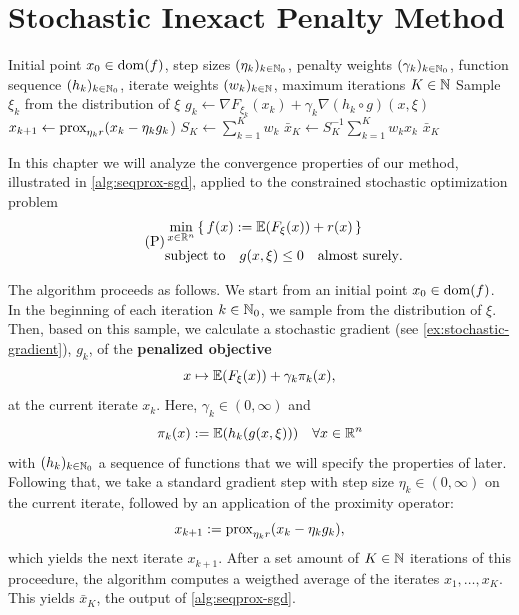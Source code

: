 \chapter{Stochastic Inexact Penalty Method}
\label{chap:sipm}

\begin{algorithm}[t]
\caption{Stochastic Inexact Penalty Method}
\label{alg:seqprox-sgd}
\begin{algorithmic}[1]
\Require Initial point $x_0\in\operatorname{dom}(f)$, step sizes $(\eta_k)_{k\in\mathbb{N}_0}$,
penalty weights $(\gamma_k)_{k\in\mathbb{N}_0}$,
function sequence $(h_k)_{k\in\mathbb{N}_0}$,
iterate weights $(w_k)_{k\in\mathbb{N}}$, maximum iterations $K\in\mathbb{N}$
    \State Sample $\xi_k$ from the distribution of $\xi$ 
    \State $g_k \gets \nabla F_{\xi_k}(x_{k}) + \gamma_k \nabla (h_k \circ g)(x,\xi)$
    \State $x_{k+1} \gets \textnormal{prox}_{\eta_k r} (x_k - \eta_k g_k$)
\EndFor
\State $S_K \gets \sum_{k=1}^{K} w_k$
\State $\bar{x}_K \gets S_K^{-1} \sum_{k=1}^{K} w_k x_k$
\State \Return $\bar{x}_{K}$
\end{algorithmic}
\end{algorithm}

In this chapter we will analyze the convergence
properties of our method, illustrated in \cref{alg:seqprox-sgd}, applied to
the constrained stochastic optimization problem
\begin{equation}
    \label{eq:main-problem-copy}
    \tag{P}
    \begin{aligned}
    &\min_{x \in \mathbb{R}^n} \, \{\, f(x) := \mathbb{E}(F_\xi(x)) + r(x) \,\} \\
    &\textup{subject to} \quad g(x, \xi) \leq 0 \quad \textnormal{almost surely}.
    \end{aligned}
\end{equation}

The algorithm proceeds as follows.
We start from an initial point $x_0\in\operatorname{dom}(f)$. In the beginning of each iteration
$k\in\mathbb{N}_0$, we sample from the distribution of $\xi$. Then,
based on this sample,
we calculate a stochastic gradient (see \cref{ex:stochastic-gradient}), $g_k$, of the \textbf{penalized objective}
\[
    x\mapsto \mathbb{E}(F_\xi(x)) + \gamma_k \pi_k(x),
\]
at the current iterate $x_k$. Here, $\gamma_k\in(0,\infty)$ and
\[
    \pi_k(x) := \mathbb{E}(h_k(g(x, \xi))) \quad\forall x\in\mathbb{R}^n
\]
with $(h_k)_{k\in\mathbb{N}_0}$ a sequence of functions
that we will specify the properties of later.
Following that, we take a standard gradient step with
step size $\eta_k\in(0,\infty)$ on the current iterate, followed
by an application of the proximity operator:
\[
    x_{k+1} := \operatorname{prox}_{\eta_k r}(x_k - \eta_k g_k),
\]
which yields the next iterate $x_{k+1}$.
After a set amount of $K\in\mathbb{N}$ iterations of this proceedure,
the algorithm computes a weigthed average of the iterates $x_1,\dots,x_K$.
This yields $\bar{x}_K$, the output of \cref{alg:seqprox-sgd}.

